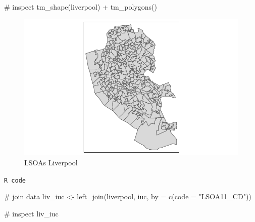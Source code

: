 \documentclass[
  letterpaper,
  DIV=11,
  numbers=noendperiod]{scrreprt}
\newenvironment{Shaded}{\begin{snugshade}}{\end{snugshade}}
\newcommand{\AttributeTok}[1]{\textcolor[rgb]{0.40,0.45,0.13}{#1}}
\newcommand{\CommentTok}[1]{\textcolor[rgb]{0.37,0.37,0.37}{#1}}
\newcommand{\FunctionTok}[1]{\textcolor[rgb]{0.28,0.35,0.67}{#1}}
\newcommand{\NormalTok}[1]{\textcolor[rgb]{0.00,0.23,0.31}{#1}}
\newcommand{\OtherTok}[1]{\textcolor[rgb]{0.00,0.23,0.31}{#1}}
\newcommand{\SpecialCharTok}[1]{\textcolor[rgb]{0.37,0.37,0.37}{#1}}
\newcommand{\StringTok}[1]{\textcolor[rgb]{0.13,0.47,0.30}{#1}}
\begin{document}
\begin{Shaded}
\begin{Highlighting}[]
\CommentTok{\# inspect}
\FunctionTok{tm\_shape}\NormalTok{(liverpool) }\SpecialCharTok{+} \FunctionTok{tm\_polygons}\NormalTok{()}
\end{Highlighting}
\end{Shaded}

\begin{figure}[H]

{\centering \includegraphics{01-geodemographics_files/figure-pdf/fig-geo-load-those-spatial-data-1.pdf}

}

\caption{\label{fig-geo-load-those-spatial-data}LSOAs Liverpool}

\end{figure}

\begin{codelisting}

\caption{\texttt{R code}}

\begin{Shaded}
\begin{Highlighting}[]
\CommentTok{\# join data}
\NormalTok{liv\_iuc }\OtherTok{\textless{}{-}} \FunctionTok{left\_join}\NormalTok{(liverpool, iuc, }\AttributeTok{by =} \FunctionTok{c}\NormalTok{(}\AttributeTok{code =} \StringTok{"LSOA11\_CD"}\NormalTok{))}

\CommentTok{\# inspect}
\NormalTok{liv\_iuc}
\end{Highlighting}
\end{Shaded}

\end{codelisting}
\end{document}
